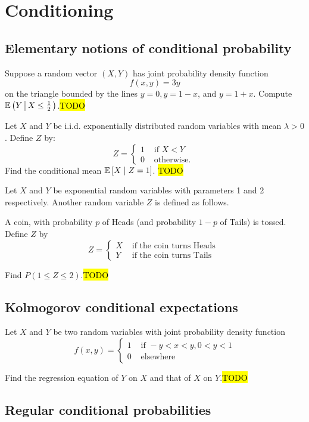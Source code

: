 
\chapter{Conditioning\label{chap:conditioning}}

\section{Elementary notions of conditional probability}
\begin{example}
\label{exa:isi2004samplepsb3}Suppose a random vector $(X,Y)$ has
joint probability density function 
\[
f(x,y)=3y
\]
 on the triangle bounded by the lines $y=0,y=1-x$, and $y=1+x$.
Compute $\mathbb{E}\left(Y\left\lvert \,X\leq\frac{1}{2}\right.\right)$.\hl{TODO}
\end{example}

\begin{example}
\label{exa:isi2007samplepsb7}Let $X$ and $Y$ be i.i.d. exponentially
distributed random variables with mean $\lambda>0$. Define $Z$ by:
\[
Z=\begin{cases}
1 & \text{ if }X<Y\\
0 & \text{ otherwise. }
\end{cases}
\]
Find the conditional mean $\mathbb{E}\left[X\mid Z=1\right]$. \hl{TODO}
\end{example}

\begin{example}
\label{exa:isi2008samplepsb7}Let $X$ and $Y$ be exponential random
variables with parameters 1 and 2 respectively. Another random variable
$Z$ is defined as follows.

A coin, with probability $p$ of Heads (and probability $1-p$ of
Tails) is tossed. Define $Z$ by 
\[
Z=\begin{cases}
X & \text{ if the coin turns Heads }\\
Y & \text{ if the coin turns Tails }
\end{cases}
\]

Find $P(1\leq Z\leq2)$.\hl{TODO}
\end{example}


\section{Kolmogorov conditional expectations}
\begin{example}
\label{exa:isi2005samplepsb11}Let $X$ and $Y$ be two random variables
with joint probability density function 
\[
f(x,y)=\begin{cases}
1 & \text{ if }-y<x<y,0<y<1\\
0 & \text{ elsewhere }
\end{cases}
\]

Find the regression equation of $Y$ on $X$ and that of $X$ on $Y$.\hl{TODO}
\end{example}


\section{Regular conditional probabilities}
